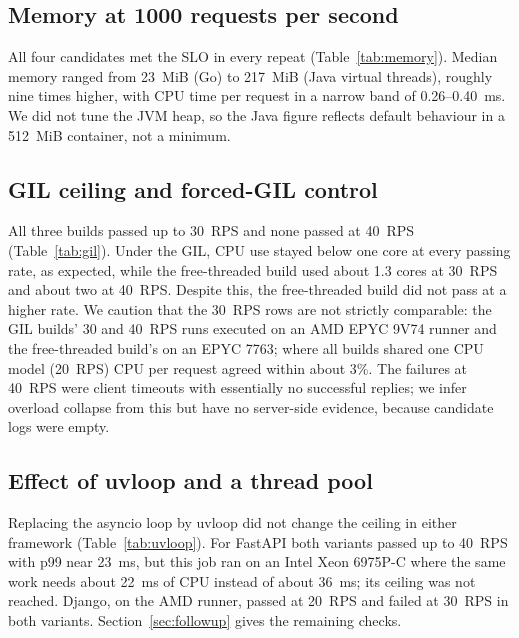 \documentclass[journal]{IEEEtran}
\begin{document}
\subsection{Memory at 1000 requests per second}

All four candidates met the SLO in every repeat (Table~\ref{tab:memory}). Median memory ranged from 23~MiB (Go) to 217~MiB (Java virtual threads), roughly nine times higher, with CPU time per request in a narrow band of 0.26--0.40~ms. We did not tune the JVM heap, so the Java figure reflects default behaviour in a 512~MiB container, not a minimum.
\subsection{GIL ceiling and forced-GIL control}

All three builds passed up to 30~RPS and none passed at 40~RPS (Table~\ref{tab:gil}). Under the GIL, CPU use stayed below one core at every passing rate, as expected, while the free-threaded build used about 1.3 cores at 30~RPS and about two at 40~RPS. Despite this, the free-threaded build did not pass at a higher rate. We caution that the 30~RPS rows are not strictly comparable: the GIL builds' 30 and 40~RPS runs executed on an AMD EPYC 9V74 runner and the free-threaded build's on an EPYC 7763; where all builds shared one CPU model (20~RPS) CPU per request agreed within about 3\%. The failures at 40~RPS were client timeouts with essentially no successful replies; we infer overload collapse from this but have no server-side evidence, because candidate logs were empty.

\subsection{Effect of uvloop and a thread pool}

Replacing the asyncio loop by uvloop did not change the ceiling in either framework (Table~\ref{tab:uvloop}). For FastAPI both variants passed up to 40~RPS with p99 near 23~ms, but this job ran on an Intel Xeon 6975P-C where the same work needs about 22~ms of CPU instead of about 36~ms; its ceiling was not reached. Django, on the AMD runner, passed at 20~RPS and failed at 30~RPS in both variants. Section~\ref{sec:followup} gives the remaining checks.
\end{document}
